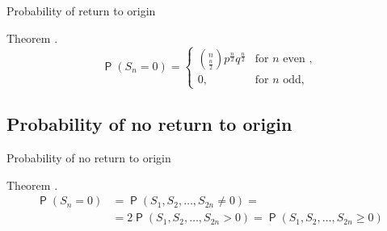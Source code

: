 \documentclass{beamer}
\DeclareMathOperator{\pr}{\mathsf{P}}
\begin{document}
\begin{frame}{Probability of return to origin}
\begin{block}{Theorem}
   \Lrw.
\[
\pr \left( S_n=0 \right) =
\begin{cases}
\binom{n}{\frac{n}{2}}p^{\frac{n}{2}}q^{\frac{n}{2}} & \text{for $n$ even },\\
0, & \text{for $n$ odd},
\end{cases}
\]
\end{block}
\end{frame}
\subsection{Probability of no return to origin}
\begin{frame}{Probability of no return to origin}
\begin{block}{Theorem}
   \Lrws.
\[
\begin{split}
\pr \left( S_n=0 \right) &=\pr \left( S_1, S_2, \ldots, S_{2n}\neq 0 \right) =\\
& =2\pr \left( S_1, S_2, \ldots, S_{2n}> 0 \right)=\pr \left( S_1, S_2, \ldots, S_{2n}\geq 0 \right)
\end{split}
\]
\end{block}
\end{frame}
\end{document}
